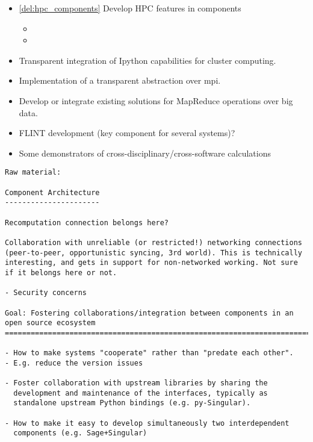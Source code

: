 \begin{Workpackage}{\thewpno}
\begin{WPDeliverables}
\begin{itemize}
\item \ref{del:hpc_components}
  Develop HPC features in components
  \begin{itemize}
  \item {}
  \item {}
  \end{itemize}


\item Transparent integration of Ipython capabilities for cluster computing.
\item Implementation of a transparent abstraction over mpi.
\item Develop or integrate existing solutions for MapReduce operations
  over big data.

\item FLINT development (key component for several systems)?

\item Some demonstrators of cross-disciplinary/cross-software calculations

\end{itemize}
\end{WPDeliverables}
\begin{verbatim}
Raw material:

Component Architecture
----------------------

Recomputation connection belongs here?

Collaboration with unreliable (or restricted!) networking connections
(peer-to-peer, opportunistic syncing, 3rd world). This is technically
interesting, and gets in support for non-networked working. Not sure
if it belongs here or not.

- Security concerns

Goal: Fostering collaborations/integration between components in an open source ecosystem
=============================================================================

- How to make systems "cooperate" rather than "predate each other".
- E.g. reduce the version issues

- Foster collaboration with upstream libraries by sharing the
  development and maintenance of the interfaces, typically as
  standalone upstream Python bindings (e.g. py-Singular).

- How to make it easy to develop simultaneously two interdependent
  components (e.g. Sage+Singular)


\end{verbatim}
\end{Workpackage}
